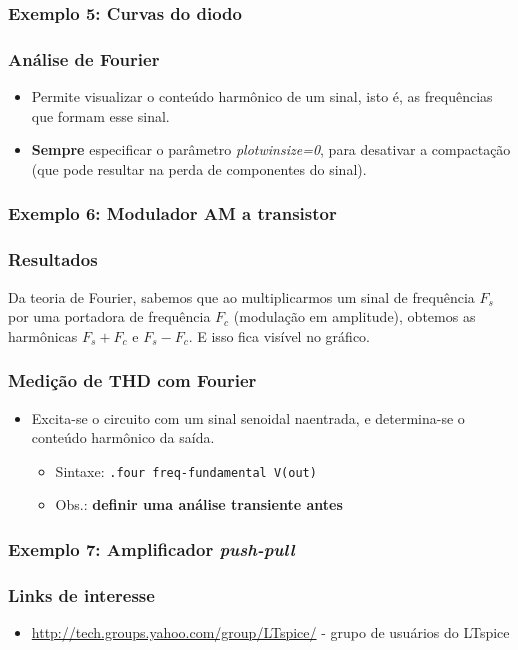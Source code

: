 \documentclass{beamer}
\begin{document}
\begin{frame}
\frametitle{Exemplo 5: Curvas do diodo}
\end{frame}

\begin{frame}
\frametitle{Análise de Fourier}
\begin{itemize}
\item Permite visualizar o conteúdo harmônico de um sinal, isto é, as frequências que formam esse sinal.
\item \textbf{Sempre} especificar o parâmetro \textit{plotwinsize=0}, para desativar a compactação (que pode resultar na perda de componentes do sinal).
\end{itemize}
\end{frame}

\begin{frame}
\frametitle{Exemplo 6: Modulador AM a transistor}
\end{frame}

\begin{frame}
\frametitle{Resultados}
Da teoria de Fourier, sabemos que ao multiplicarmos um sinal de frequência $F_s$ por uma portadora de frequência $F_c$ (modulação em amplitude), obtemos as harmônicas $F_s + F_c$ e $F_s - F_c$. E isso fica visível no gráfico.
\end{frame}

\begin{frame}
\frametitle{Medição de THD com Fourier}
\begin{itemize}
\item Excita-se o circuito com um sinal senoidal naentrada, e determina-se o conteúdo harmônico da saída.
\begin{itemize}
\item Sintaxe: \texttt{.four freq-fundamental V(out)}
\item Obs.: \textbf{definir uma análise transiente antes}
\end{itemize}
\end{itemize}
\end{frame}

\begin{frame}
\frametitle{Exemplo 7: Amplificador \textit{push-pull}}
\end{frame}

\begin{frame}
\frametitle{Links de interesse}
\begin{itemize}
\item \url{http://tech.groups.yahoo.com/group/LTspice/} - grupo de usuários do LTspice
\end{itemize}
\end{frame}
\end{document}
